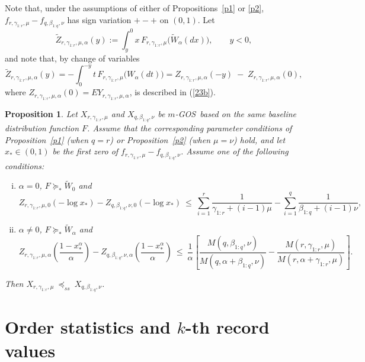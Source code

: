 \documentclass [11pt]{article}
\newtheorem{proposition}{Proposition}
\newcommand{\gos}{GOS}
\begin{document}
Note that, under the assumptions of either of Propositions~\ref{p1} or \ref{p2}, $f_{r,\gamma_{1:r},\mu}-f_{q,\beta_{1:q},\nu}$ has sign variation $+-+$ on $(0,1)$.
Let
\[
\widetilde Z_{r,\gamma_{1:r}, \mu,\alpha}(y)
:=
\int_y^0 x \,F_{r,\gamma_{1:r}, \mu} \bigl(\widetilde W_\alpha (dx)\bigr),
\qquad y<0,
\]
and note that, by change of variables 
$$
\widetilde Z_{r,\gamma_{1:r},\mu,\alpha}(y)=
-\int_0^{-y} t \,F_{r,\gamma_{1:r}, \mu} \bigl(W_\alpha(dt)\bigr)=
Z_{r,\gamma_{1:r},\mu,\alpha}(-y)\;-\;Z_{r,\gamma_{1:r},\mu,\alpha}(0),
$$
where $Z_{r,\gamma_{1:r}, \mu, \alpha}(0)=E Y_{r,\gamma_{1:r}, \mu, \alpha}$, is described in (\ref{23b}).
{\samepage
\begin{proposition}
\label{negSS}
Let $X_{r,\gamma_{1:r},\mu}$ and $X_{q,\beta_{1:q},\nu}$ be $m$-\gos\ based on the same baseline distribution function $F$.
Assume that the corresponding parameter conditions of Proposition~\ref{p1} (when $q=r$) or Proposition~\ref{p2} (when $\mu=\nu$) hold, and let $x_*\in(0,1)$ be the first zero of $f_{r,\gamma_{1:r},\mu}-f_{q,\beta_{1:q},\nu}$.
Assume one of the following conditions:
    \begin{enumerate}[(i)]
    \item 
    $\alpha=0$, $F\succeq_* \widetilde W_0$ and
    \begin{equation*}
    Z_{r,\gamma_{1:r},\mu,0}(-\log x_*)-Z_{q,\beta_{1:q},\nu,0}(-\log x_*)
    \ \le\
    \sum_{i=1}^r \frac{1}{\gamma_{1:r}+(i-1)\mu}
    -
    \sum_{i=1}^q \frac{1}{\beta_{1:q}+(i-1)\nu},
    \end{equation*}	
    
    \item 
    $\alpha\neq 0$, $F\succeq_* \widetilde W_\alpha$ and
    \begin{equation*}
    Z_{r,\gamma_{1:r},\mu,\alpha}\left(\frac{1-x_*^\alpha}{\alpha}\right)-
    Z_{q,\beta_{1:q},\nu,\alpha}\left(\frac{1-x_*^\alpha}{\alpha}\right)
    \ \leq\
    \frac{1}{\alpha}\left[
    \frac{M(q,\beta_{1:q},\nu)}{M(q,\alpha+\beta_{1:q},\nu)}
    -
    \frac{M(r,\gamma_{1:r},\mu)}{M(r,\alpha+\gamma_{1:r},\mu)}
    \right].
    \end{equation*}
    \end{enumerate}
Then
$X_{r,\gamma_{1:r},\mu}\ \preceq_{ss}\ X_{q,\beta_{1:q},\nu}$.
\end{proposition}}

\section{Order statistics and $k$-th record values}
\label{sec:records}
\end{document}
